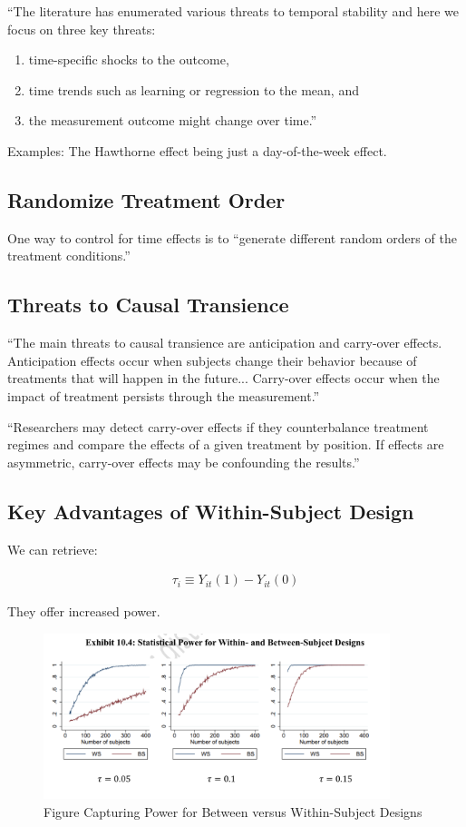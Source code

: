 \documentclass[10pt]{article}
\begin{document}
``The literature has enumerated various threats to temporal 
stability and here we focus on three key threats: 

\begin{enumerate}
    \item time-specific shocks to the outcome, 
    \item time trends such as learning or regression to the mean, and 
    \item the measurement outcome might change over time.'' 
\end{enumerate}

Examples: The Hawthorne effect being just a day-of-the-week effect.


\subsection{Randomize Treatment Order}

One way to control for time effects 
is to ``generate different random orders of the treatment conditions.''

\subsection{Threats to Causal Transience}

``The main threats to causal transience are anticipation and 
carry-over effects. Anticipation effects occur when subjects 
change their behavior because of treatments that will
happen in the future...
Carry-over effects occur when the impact of treatment persists through the measurement.''

``Researchers may detect carry-over effects if 
they counterbalance treatment regimes and compare 
the effects of a given treatment by position. If effects 
are asymmetric, carry-over effects may be confounding the results.''

\subsection{Key Advantages of Within-Subject Design}

We can retrieve:

\begin{align}
    \tau_i \equiv Y_{i t}(1)-Y_{i t}(0)
\end{align}

They offer increased power. 

\begin{figure}[!htb]
    \centering
        \includegraphics[width=0.9\textwidth]{../input/between_v_within.png}
    \caption{Figure Capturing Power for Between versus Within-Subject Designs}
\end{figure}
\end{document}
